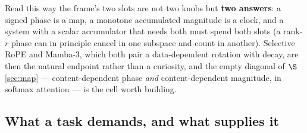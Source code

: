 \documentclass[11pt]{article}
\begin{document}
\noindent Read this way the frame's two slots are not two knobs but \textbf{two
answers}: a signed phase is a map, a monotone accumulated magnitude is a clock, and a
system with a scalar accumulator that needs both must spend both slots (a rank-$r$
phase can in principle cancel in one subspace and count in another). Selective RoPE
and Mamba-3, which both pair a data-dependent rotation with decay, are then the
natural endpoint rather than a curiosity, and the empty diagonal of
$\S$\ref{sec:map} --- content-dependent phase \emph{and} content-dependent magnitude,
in softmax attention --- is the cell worth building.

\subsection{What a task demands, and what supplies it}
\end{document}
